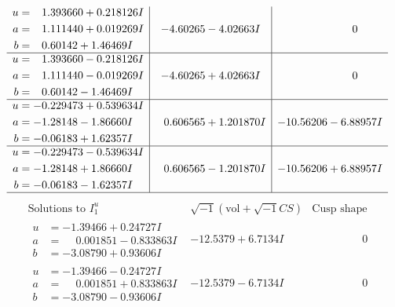 \documentclass[1p]{elsarticle_modified}
\theoremstyle{definition}
\newcommand{\I}{\sqrt{-1}}
\begin{document}
$$\begin{array}{c|c|c}
\begin{aligned}
u &= \phantom{-}1.393660 + 0.218126 I \\
a &= \phantom{-}1.111440 + 0.019269 I \\
b &= \phantom{-}0.60142 + 1.46469 I\end{aligned}
 & -4.60265 - 4.02663 I & \phantom{-0.000000 } 0 \\ \hline\begin{aligned}
u &= \phantom{-}1.393660 - 0.218126 I \\
a &= \phantom{-}1.111440 - 0.019269 I \\
b &= \phantom{-}0.60142 - 1.46469 I\end{aligned}
 & -4.60265 + 4.02663 I & \phantom{-0.000000 } 0 \\ \hline\begin{aligned}
u &= -0.229473 + 0.539634 I \\
a &= -1.28148 - 1.86660 I \\
b &= -0.06183 + 1.62357 I\end{aligned}
 & \phantom{-}0.606565 + 1.201870 I & -10.56206 - 6.88957 I \\ \hline\begin{aligned}
u &= -0.229473 - 0.539634 I \\
a &= -1.28148 + 1.86660 I \\
b &= -0.06183 - 1.62357 I\end{aligned}
 & \phantom{-}0.606565 - 1.201870 I & -10.56206 + 6.88957 I\\
 \hline 
 \end{array}$$\newpage$$\begin{array}{c|c|c}  
\text{Solutions to }I^u_{1}& \I (\text{vol} + \sqrt{-1}CS) & \text{Cusp shape}\\
 \hline 
\begin{aligned}
u &= -1.39466 + 0.24727 I \\
a &= \phantom{-}0.001851 - 0.833863 I \\
b &= -3.08790 + 0.93606 I\end{aligned}
 & -12.5379 + 6.7134 I & \phantom{-0.000000 } 0 \\ \hline\begin{aligned}
u &= -1.39466 - 0.24727 I \\
a &= \phantom{-}0.001851 + 0.833863 I \\
b &= -3.08790 - 0.93606 I\end{aligned}
 & -12.5379 - 6.7134 I & \phantom{-0.000000 } 0 \\ \hline\begin{aligned}

\end{aligned}
\end{array}$$
\end{document}
